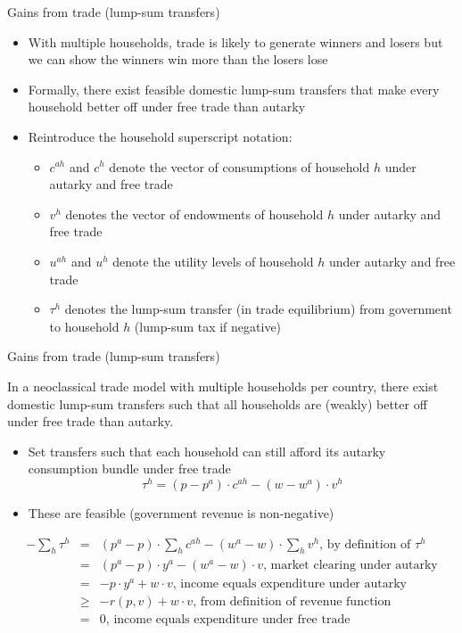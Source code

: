 \documentclass[10pt,notes=hide]{beamer}
\begin{document}
\begin{frame}{Gains from trade (lump-sum transfers)}
\begin{itemize}
\item With multiple households, trade is likely to generate winners and losers but we can show the winners win more than the losers lose
\item Formally, there exist feasible domestic lump-sum transfers that make every household better off under free trade than autarky
\item Reintroduce the household superscript notation:
\begin{itemize}
\item $c^{ah}$ and $c^{h}$ denote the vector of consumptions of household $h$ under autarky and free trade
\item $v^{h}$ denotes the vector of endowments of household $h$ under autarky and free trade
\item $u^{ah}$ and $u^{h}$ denote the utility levels of household $h$ under autarky and free trade
\item $\tau ^{h}$ denotes the lump-sum transfer (in trade equilibrium) from government to household $h$ (lump-sum tax if negative)
\end{itemize}
\end{itemize}
\end{frame}
\begin{frame}{Gains from trade (lump-sum transfers)}
\begin{theorem}
In a neoclassical trade model with multiple households per country, there
exist domestic lump-sum transfers such that all households are (weakly)
better off under free trade than autarky.
\end{theorem}
\begin{itemize}
\item Set transfers such that each household can still afford its autarky
consumption bundle under free trade
\begin{equation*}
\tau ^{h}=\left( p-p^{a}\right) \cdot c^{ah}-\left( w-w^{a}\right) \cdot v^{h}
\end{equation*}
\item These are feasible (government revenue is non-negative)
\end{itemize}
\begin{align*}
- \sum\nolimits_{h}\tau ^{h} &=&\left( p^{a}-p\right)  \cdot \sum\nolimits_{h}c^{ah}-\left(
w^{a}-w\right)  \cdot \sum\nolimits_{h}v^{h}\text{, by definition of }\tau ^{h} \\
&=&\left( p^{a}-p\right)  \cdot y^{a}-\left( w^{a}-w\right)  \cdot v\text{, market
clearing under autarky} \\
&=&-p \cdot y^{a}+w \cdot v\text{, income equals expenditure under autarky} \\
&\geq &-r\left( p,v\right) +w \cdot v\text{, from definition of revenue function}
\\
&=&0\text{, income equals expenditure under free trade}
\end{align*}
\end{frame}
\end{document}

